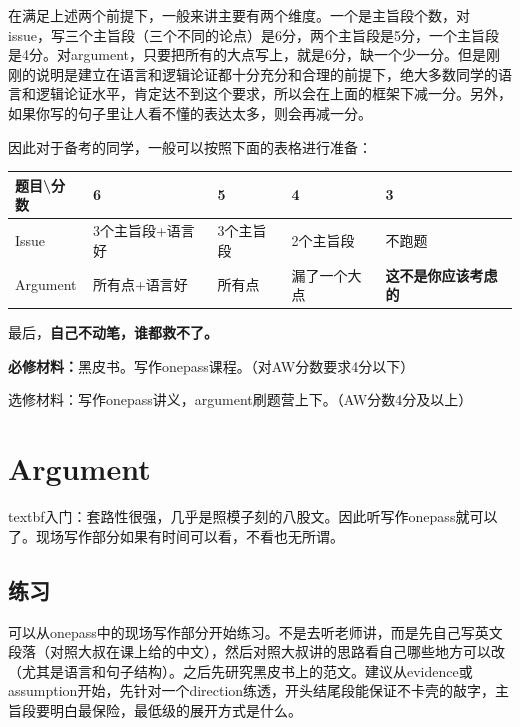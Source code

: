 \documentclass[cn,plain]{./src/qyxfbook}
\newenvironment{material}{\begin{tcolorbox}[title={材料}]}{\end{tcolorbox}}
\begin{document}
在满足上述两个前提下，一般来讲主要有两个维度。一个是主旨段个数，对issue，写三个主旨段（三个不同的论点）是6分，两个主旨段是5分，一个主旨段是4分。对argument，只要把所有的大点写上，就是6分，缺一个少一分。但是刚刚的说明是建立在语言和逻辑论证都十分充分和合理的前提下，绝大多数同学的语言和逻辑论证水平，肯定达不到这个要求，所以会在上面的框架下减一分。另外，如果你写的句子里让人看不懂的表达太多，则会再减一分。

因此对于备考的同学，一般可以按照下面的表格进行准备：

\begin{longtable}[]{@{}lllll@{}}
\toprule
题目\textbackslash{}分数 & 6 & 5 & 4 & 3\tabularnewline
\midrule
\endhead
Issue & 3个主旨段+语言好 & 3个主旨段 & 2个主旨段 & 不跑题\tabularnewline
Argument & 所有点+语言好 & 所有点 & 漏了一个大点 &
\textbf{这不是你应该考虑的}\tabularnewline
\bottomrule
\end{longtable}

最后，\textbf{自己不动笔，谁都救不了。}

\begin{material}
\textbf{必修材料：}黑皮书。写作onepass课程。（对AW分数要求4分以下）

选修材料：写作onepass讲义，argument刷题营上下。（AW分数4分及以上）
\end{material}

\section{Argument}
textbf{入门：}套路性很强，几乎是照模子刻的八股文。因此听写作onepass就可以了。现场写作部分如果有时间可以看，不看也无所谓。

\subsection{练习}
可以从onepass中的现场写作部分开始练习。不是去听老师讲，而是先自己写英文段落（对照大叔在课上给的中文），然后对照大叔讲的思路看自己哪些地方可以改（尤其是语言和句子结构）。之后先研究黑皮书上的范文。建议从evidence或assumption开始，先针对一个direction练透，开头结尾段能保证不卡壳的敲字，主旨段要明白最保险，最低级的展开方式是什么。
\end{document}
